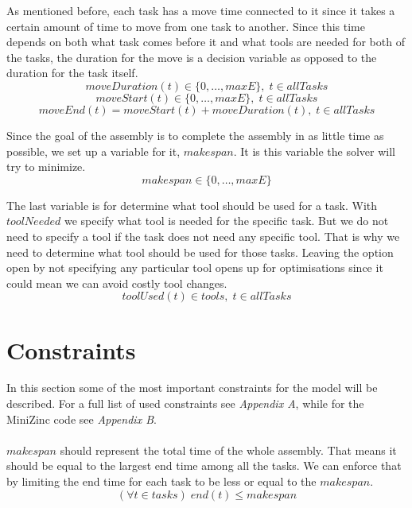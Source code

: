   \noindent As mentioned before, each task has a move time connected to it since it takes a certain amount of time to move from one task to another. Since this time depends on both what task comes before it and what tools are needed for both of the tasks, the duration for the move is a decision variable as opposed to the duration for the task itself.
 \begin{equation}\label{eq:49}
 moveDuration(t) \in \{0 , \ldots , maxE\}, \; t \in allTasks
 \end{equation}
 \begin{equation}\label{eq:50}
 moveStart(t) \in \{0 , \ldots , maxE\}, \; t \in allTasks
 \end{equation}
 \begin{equation}\label{eq:51}
 moveEnd(t) = moveStart(t) + moveDuration(t), \; t \in allTasks
 \end{equation}

  \noindent Since the goal of the assembly is to complete the assembly in as little time as possible, we set up a variable for it, $makespan$. It is this variable the solver will try to minimize.
 \begin{equation}\label{eq:48}
 makespan \in \{0 , \ldots , maxE\}
 \end{equation}

  \noindent The last variable is for determine what tool should be used for a task. With $toolNeeded$ we specify what tool is needed for the specific task. But we do not need to specify a tool if the task does not need any specific tool. That is why we need to determine what tool should be used for those tasks. Leaving the option open by not specifying any particular tool opens up for optimisations since it could mean we can avoid costly tool changes.
 \begin{equation}\label{eq:52}
 toolUsed(t) \in tools, \; t \in allTasks
 \end{equation}
  
 
 \section{Constraints}\label{seq:constraints}
 In this section some of the most important constraints for the model will be described. For a full list of used constraints see \emph{Appendix A}, while for the MiniZinc code see \emph{Appendix B}.
 \\\\
 $makespan$ should represent the total time of the whole assembly. That means it should be equal to the largest end time among all the tasks. We can enforce that by limiting the end time for each task to be less or equal to the $makespan$.
 \begin{equation}\label{eq:92}
 (\forall t \in tasks) \; end(t) \le makespan
 \end{equation}


